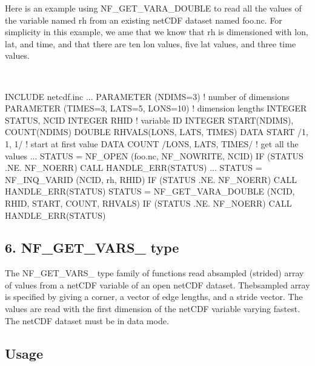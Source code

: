 Here is an example using N\+F\+\_\+\+G\+E\+T\+\_\+\+V\+A\+R\+A\+\_\+\+D\+O\+U\+B\+LE to read all the values of the variable named rh from an existing net\+C\+DF dataset named foo.\+nc. For simplicity in this example, we ame that we know that rh is dimensioned with lon, lat, and time, and that there are ten lon values, five lat values, and three time values.

 

I\+N\+C\+L\+U\+DE \textquotesingle{}netcdf.\+inc\textquotesingle{} ... P\+A\+R\+A\+M\+E\+T\+ER (N\+D\+I\+MS=3) ! number of dimensions P\+A\+R\+A\+M\+E\+T\+ER (T\+I\+M\+ES=3, L\+A\+TS=5, L\+O\+NS=10) ! dimension lengths I\+N\+T\+E\+G\+ER S\+T\+A\+T\+US, N\+C\+ID I\+N\+T\+E\+G\+ER R\+H\+ID ! variable ID I\+N\+T\+E\+G\+ER S\+T\+A\+R\+T(\+N\+D\+I\+M\+S), C\+O\+U\+N\+T(\+N\+D\+I\+M\+S) D\+O\+U\+B\+LE R\+H\+V\+A\+L\+S(\+L\+O\+N\+S, L\+A\+T\+S, T\+I\+M\+E\+S) D\+A\+TA S\+T\+A\+RT /1, 1, 1/ ! start at first value D\+A\+TA C\+O\+U\+NT /\+L\+O\+NS, L\+A\+TS, T\+I\+M\+E\+S/ ! get all the values ... S\+T\+A\+T\+US = N\+F\+\_\+\+O\+P\+EN (\textquotesingle{}foo.\+nc\textquotesingle{}, N\+F\+\_\+\+N\+O\+W\+R\+I\+TE, N\+C\+ID) IF (S\+T\+A\+T\+US .NE. N\+F\+\_\+\+N\+O\+E\+RR) C\+A\+LL H\+A\+N\+D\+L\+E\+\_\+\+E\+R\+R(\+S\+T\+A\+T\+U\+S) ... S\+T\+A\+T\+US = N\+F\+\_\+\+I\+N\+Q\+\_\+\+V\+A\+R\+ID (N\+C\+ID, \textquotesingle{}rh\textquotesingle{}, R\+H\+ID) IF (S\+T\+A\+T\+US .NE. N\+F\+\_\+\+N\+O\+E\+RR) C\+A\+LL H\+A\+N\+D\+L\+E\+\_\+\+E\+R\+R(\+S\+T\+A\+T\+U\+S) S\+T\+A\+T\+US = N\+F\+\_\+\+G\+E\+T\+\_\+\+V\+A\+R\+A\+\_\+\+D\+O\+U\+B\+LE (N\+C\+ID, R\+H\+ID, S\+T\+A\+RT, C\+O\+U\+NT, R\+H\+V\+A\+LS) IF (S\+T\+A\+T\+US .NE. N\+F\+\_\+\+N\+O\+E\+RR) C\+A\+LL H\+A\+N\+D\+L\+E\+\_\+\+E\+R\+R(\+S\+T\+A\+T\+U\+S)

\subsection*{6. N\+F\+\_\+\+G\+E\+T\+\_\+\+V\+A\+R\+S\+\_\+ type }

The N\+F\+\_\+\+G\+E\+T\+\_\+\+V\+A\+R\+S\+\_\+ type family of functions read absampled (strided) array of values from a net\+C\+DF variable of an open net\+C\+DF dataset. Thebsampled array is specified by giving a corner, a vector of edge lengths, and a stride vector. The values are read with the first dimension of the net\+C\+DF variable varying fastest. The net\+C\+DF dataset must be in data mode.

\subsection*{Usage }


